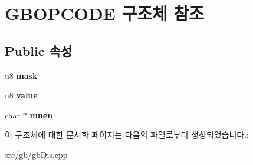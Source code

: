 \hypertarget{struct_g_b_o_p_c_o_d_e}{}\section{G\+B\+O\+P\+C\+O\+DE 구조체 참조}
\label{struct_g_b_o_p_c_o_d_e}
\subsection*{Public 속성}
\begin{DoxyCompactItemize}
\item 
\mbox{\label{struct_g_b_o_p_c_o_d_e_afb18b1f0b688b4274a48b425b65942d4}} 
u8 {\bfseries mask}
\item 
\mbox{\label{struct_g_b_o_p_c_o_d_e_a7a595245e5b9550b3ad680a89e5f010d}} 
u8 {\bfseries value}
\item 
\mbox{\label{struct_g_b_o_p_c_o_d_e_ac9518919dba6fed9895f2e41fb61b6ca}} 
char $\ast$ {\bfseries mnen}
\end{DoxyCompactItemize}


이 구조체에 대한 문서화 페이지는 다음의 파일로부터 생성되었습니다.\+:\begin{DoxyCompactItemize}
\item 
src/gb/gb\+Dis.\+cpp\end{DoxyCompactItemize}
